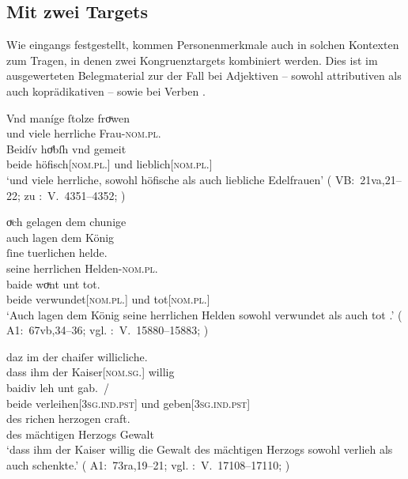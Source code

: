 \subsection{Mit zwei Targets}
\label{subsec:beidkoordtarg}

Wie eingangs festgestellt, kommen Personenmerkmale auch in solchen Kontexten
zum Tragen, in denen zwei Kongruenztargets kombiniert werden. Dies ist im
ausgewerteten Belegmaterial zur \KC{} der Fall bei Adjektiven --
sowohl attributiven  als auch koprädikativen
 -- sowie bei Verben .

\begin{exe}
\ex \begin{xlist}
	\ex\label{ex:konjattradj}
		\gll Vnd maníge ſtolze froͮwen \\
			und viele herrliche Frau-\textsc{nom.pl.\FemF} \\%
	\sn \gll Beidív hoͤbſh vnd gemeit \\
			beide höfisch[\textsc{nom.pl.\FemF}] und lieblich[\textsc{nom.pl.\FemF}] \\
		\trans `und viele herrliche, sowohl höfische als auch liebliche Edelfrauen'
			(%
				VB:~21va,21--22; zu
				\KC:~V.~4351--4352;
				\cite[161]{schroeder1895}%
			)

	\ex \label{ex:konjcopredadj}
		\gll oͮch gelagen dem chunige \\
			auch lagen dem König \\
	\sn \gll ſine tuerlichen helde. \\
			seine herrlichen Helden-\textsc{nom.pl.\MascM} \\
	\sn \gll baide woͮnt unt tot. \\
			beide verwundet[\textsc{nom.pl.\MascM}] und tot[\textsc{nom.pl.\MascM}] \\
		\trans `Auch lagen dem König seine herrlichen Helden sowohl verwundet als auch tot .'
			(%
				A1:~67vb,34--36; vgl.
				\KC:~V.~15880--15883;
				\cite[368]{schroeder1895}%
			)

	\ex \label{ex:konjvb}
		\gll daz im der chaiſer willicliche. \\
			dass ihm der Kaiser[\textsc{nom.sg.\MascM}] willig \\
	\sn \gll baidiv leh unt gab.~/ \\
			beide verleihen[\textsc{3sg\subM.ind.pst}] und
			geben[\textsc{3sg\subM.ind.pst}] \\
		\gll des richen herzogen craft. \\
			des mächtigen Herzogs Gewalt \\
		\trans `dass ihm der Kaiser willig die Gewalt des mächtigen Herzogs sowohl verlieh als auch schenkte.'
			(%
				A1:~73ra,19--21; vgl.
				\KC:~V.~17108--17110;
				\cite[389]{schroeder1895}%
			)
	\end{xlist}
\end{exe}

